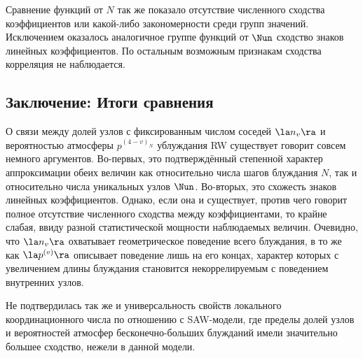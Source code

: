 Сравнение функций от $N$ так же показало отсутствие численного сходства коэффициентов или какой-либо закономерности среди групп значений. 
Исключением оказалось аналогичное группе функций от $\Nun$ сходство знаков линейных коэффициентов.
По остальным возможным признакам сходства корреляция не наблюдается.

\subsection{Заключение: Итоги сравнения}

О связи между долей узлов с фиксированным числом соседей $\la n_v \ra$ и вероятностью атмосферы $p^{(4-v)_N}$ ублуждания RW существует говорит совсем немного аргументов.
Во-первых, это подтверждённый степенной характер аппроксимации обеих величин как относительно числа шагов блуждания $N$, так и относительно числа уникальных узлов $\Nun$.
Во-вторых, это схожесть знаков линейных коэффициентов. 
Однако, если она и существует, против чего говорит полное отсутствие численного сходства между коэффициентами, то крайне слабая, ввиду разной статистической мощности наблюдаемых величин. 
Очевидно, что $\la n_v \ra$ охватывает геометрическое поведение всего блуждания, в то же как $\la p^{(v)} \ra$ описывает поведение лишь на его концах, характер которых с увеличением длины блуждания становится некоррелируемым с поведением внутренних узлов.

Не подтвердилась так же и универсальность свойств локального координационного числа по отношению с SAW-модели, где пределы долей узлов и вероятностей атмосфер бесконечно-больших блужданий имели значительно большее сходство, нежели в данной модели.
